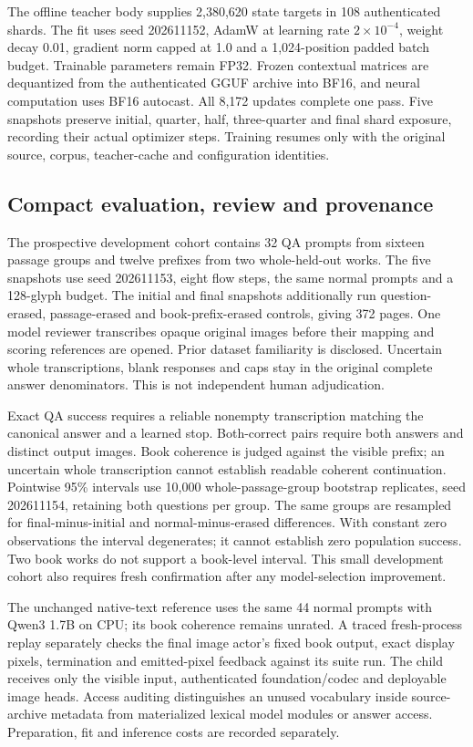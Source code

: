 The offline teacher body supplies 2,380,620 state targets in 108 authenticated
shards. The fit uses seed 202611152, AdamW at learning rate $2\times10^{-4}$,
weight decay 0.01, gradient norm capped at 1.0 and a 1,024-position padded
batch budget. Trainable parameters remain FP32. Frozen contextual matrices
are dequantized from the authenticated GGUF archive into BF16, and neural
computation uses BF16 autocast. All 8,172 updates complete one pass. Five snapshots preserve
initial, quarter, half, three-quarter and final shard exposure, recording
their actual optimizer steps. Training resumes only with the original source,
corpus, teacher-cache and configuration identities.

\subsection*{Compact evaluation, review and provenance}
The prospective development cohort contains 32 QA prompts from sixteen passage
groups and twelve prefixes from two whole-held-out works. The five snapshots
use seed 202611153, eight flow steps, the same normal prompts and a 128-glyph
budget. The initial and final snapshots additionally run question-erased,
passage-erased and book-prefix-erased controls, giving 372 pages. One model
reviewer transcribes opaque original images before their mapping and scoring
references are opened. Prior dataset familiarity is disclosed. Uncertain
whole transcriptions, blank responses and caps stay in the original complete
answer denominators. This is not independent human adjudication.

Exact QA success requires a reliable nonempty transcription matching the
canonical answer and a learned stop. Both-correct pairs require both answers
and distinct output images. Book coherence is judged against the visible
prefix; an uncertain whole transcription cannot establish readable coherent
continuation. Pointwise 95\% intervals use 10,000 whole-passage-group bootstrap
replicates, seed 202611154, retaining both questions per group. The same groups
are resampled for final-minus-initial and normal-minus-erased differences.
With constant zero observations the interval degenerates; it cannot establish
zero population success. Two book works do not support a book-level interval.
This small development cohort also requires fresh confirmation after any
model-selection improvement.

The unchanged native-text reference uses the same 44 normal prompts with
Qwen3 1.7B on CPU; its book coherence remains unrated. A traced fresh-process
replay separately checks the final image actor's fixed book output, exact
display pixels, termination and emitted-pixel feedback against its suite run.
The child receives only the visible input, authenticated foundation/codec and
deployable image heads. Access auditing distinguishes an unused vocabulary
inside source-archive metadata from materialized lexical model modules or
answer access. Preparation, fit and inference costs are recorded separately.

